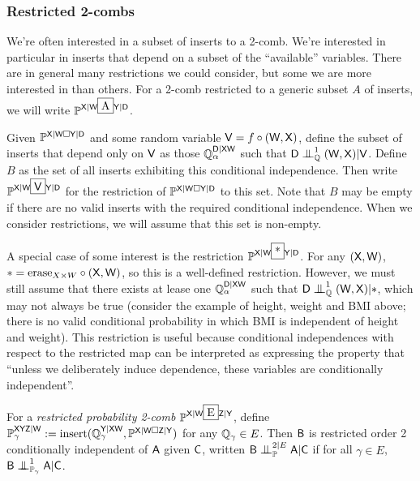 \subsubsection{Restricted 2-combs}


We're often interested in a subset of inserts to a 2-comb. We're interested in particular in inserts that depend on a subset of the ``available'' variables. There are in general many restrictions we could consider, but some we are more interested in than others. For a 2-comb restricted to a generic subset $A$ of inserts, we will write $\prob{P}^{\RV{X}|\RV{W}\framebox{A} \RV{Y}|\RV{D}}$. 

Given $\mathbb{P}^{\mathsf{X}|\mathsf{W}\square \mathsf{Y}|\mathsf{D}}$ and some random variable $\mathsf{V}=f\circ(\mathsf{W},\mathsf{X})$, define the subset of inserts that depend only on $\mathsf{V}$ as those $\mathbb{Q}_\alpha^{\mathsf{D}|\mathsf{XW}}$ such that $\RV{D}\CI^1_{\model{Q}}(\RV{W},\RV{X})|\RV{V}$. Define $B$ as the set of all inserts exhibiting this conditional independence. Then write  $\prob{P}^{\RV{X}|\RV{W}\framebox{\RV{V}} \RV{Y}|\RV{D}}$ for the restriction of $\mathbb{P}^{\mathsf{X}|\mathsf{W}\square \mathsf{Y}|\mathsf{D}}$ to this set. Note that $B$ may be empty if there are no valid inserts with the required conditional independence. When we consider restrictions, we will assume that this set is non-empty.

A special case of some interest is the restriction $\prob{P}^{\RV{X}|\RV{W}\framebox{*} \RV{Y}|\RV{D}}$. For any $(\mathsf{X},\mathsf{W})$, $*=\text{erase}_{X\times W} \circ (\mathsf{X},\mathsf{W})$, so this is a well-defined restriction. However, we must still assume that there exists at lease one $\mathbb{Q}_\alpha^{\mathsf{D}|\mathsf{XW}}$ such that $\RV{D}\CI^1_{\model{Q}}(\RV{W},\RV{X})|*$, which may not always be true (consider the example of height, weight and BMI above; there is no valid conditional probability in which BMI is independent of height and weight). This restriction is useful because conditional independences with respect to the restricted map can be interpreted as expressing the property that ``unless we deliberately induce dependence, these variables are conditionally independent''.

\begin{definition}
For a \emph{restricted probability 2-comb} $\prob{P}^{\RV{X}|\RV{W}\framebox{E}\RV{Z}|\RV{Y}}$, define $\mathbb{P}_\gamma^{\mathsf{XYZ}|\mathsf{W}}:=\text{insert}(\mathbb{Q}_\gamma^{\mathsf{Y}|\mathsf{XW}}, \mathbb{P}^{\mathsf{X}|\mathsf{W}\square\mathsf{Z}|\mathsf{Y}})$ for any $\mathbb{Q}_\gamma\in E$. Then $\mathsf{B}$ is restricted order 2 conditionally independent of $\mathsf{A}$ given $\mathsf{C}$, written $\RV{B}\CI^{2|E}_{\prob{P}}\RV{A}|\RV{C}$ if for all $\gamma\in E$, $\RV{B}\CI^1_{\prob{P}_\gamma}\RV{A}|\RV{C}$.
\end{definition}

